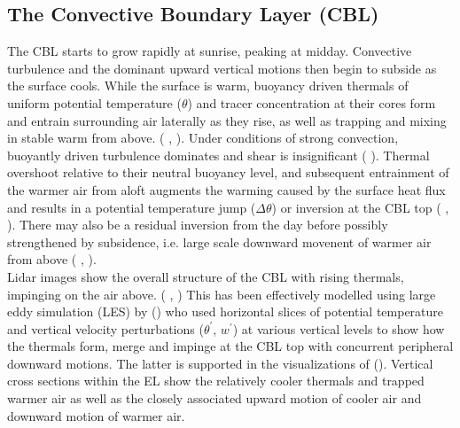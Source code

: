 \subsection{The Convective Boundary Layer (CBL)}

The \acs{CBL} starts to grow rapidly at sunrise, peaking at midday.  Convective turbulence and the dominant upward vertical motions then begin to subside as the surface cools.  While the surface is warm, buoyancy driven thermals of uniform potential temperature ($\theta$) and tracer concentration at their cores form and entrain surrounding air laterally as they rise, as well as trapping and mixing in stable warm from above. (\citeauthor{Stull-BLMetIntro} \citeyear{Stull-BLMetIntro}, \citeauthor{CrumStullEl} \citeyear{CrumStullEl}).  Under conditions of strong convection, buoyantly driven turbulence dominates and shear is insignificant (\citeauthor{DirLEddy} \citeyear{DirLEddy}). Thermal overshoot relative to their neutral buoyancy level, and subsequent entrainment of the warmer air from aloft augments the warming caused by the surface heat flux and results in a potential temperature jump ($\Delta \theta$) or inversion at the \acs{CBL} top (\citeauthor{SchmidtSchu} \citeyear{SchmidtSchu}, \citeauthor{Turner86} \citeyear{Turner86}).  There may also be a residual inversion from the day before possibly strengthened by subsidence, i.e. large scale downward movenent of warmer air from above (\citeauthor{Stull-BLMetIntro} \citeyear{Stull-BLMetIntro}, \citeauthor{SullMoengStev} \citeyear{SullMoengStev}).\\  

Lidar images show the overall structure of the \acs{CBL} with rising thermals, impinging on the air above. (\citeauthor{CrumStullEl} , \citeauthor{Traum11} \citeyear{Traum11}) This has been effectively modelled using large eddy simulation (\acs{LES}) by \citeauthor{SchmidtSchu} (\citeyear{SchmidtSchu}) who used horizontal slices of potential temperature and vertical velocity perturbations ($\theta^{'}$, $w^{'}$) at various vertical levels to show how the thermals form, merge and impinge at the \acs{CBL} top with concurrent peripheral downward motions.  The latter is supported in the visualizations of \citeauthor{SullMoengStev} (\citeyear{SullMoengStev}).  Vertical cross sections within the \acs{EL} show the relatively cooler thermals and trapped warmer air as well as the closely associated upward motion of cooler air and downward motion of warmer air.\\ 

